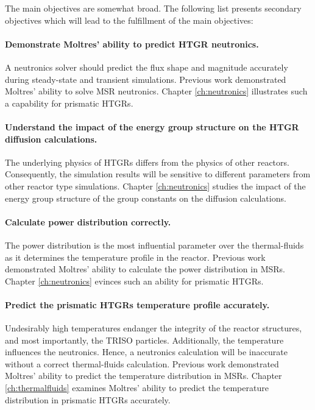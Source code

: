 \vskip 0.6cm
The main objectives are somewhat broad.
The following list presents secondary objectives which will lead to the fulfillment of the main objectives:

\paragraph{Demonstrate Moltres' ability to predict HTGR neutronics.}
A neutronics solver should predict the flux shape and magnitude accurately during steady-state and transient simulations.
Previous work demonstrated Moltres' ability to solve MSR neutronics.
Chapter \ref{ch:neutronics} illustrates such a capability for prismatic HTGRs.

\paragraph{Understand the impact of the energy group structure on the HTGR diffusion calculations.}
The underlying physics of \glspl{HTGR} differs from the physics of other reactors.
Consequently, the simulation results will be sensitive to different parameters from other reactor type simulations.
Chapter \ref{ch:neutronics} studies the impact of the energy group structure of the group constants on the diffusion calculations.

\paragraph{Calculate power distribution correctly.}
The power distribution is the most influential parameter over the thermal-fluids as it determines the temperature profile in the reactor.
Previous work demonstrated Moltres' ability to calculate the power distribution in MSRs.
Chapter \ref{ch:neutronics} evinces such an ability for prismatic HTGRs.

\paragraph{Predict the prismatic HTGRs temperature profile accurately.}
Undesirably high temperatures endanger the integrity of the reactor structures, and most importantly, the TRISO particles.
Additionally, the temperature influences the neutronics.
Hence, a neutronics calculation will be inaccurate without a correct thermal-fluids calculation. 
Previous work demonstrated Moltres' ability to predict the temperature distribution in MSRs.
Chapter \ref{ch:thermalfluids} examines Moltres' ability to predict the temperature distribution in prismatic HTGRs accurately.

